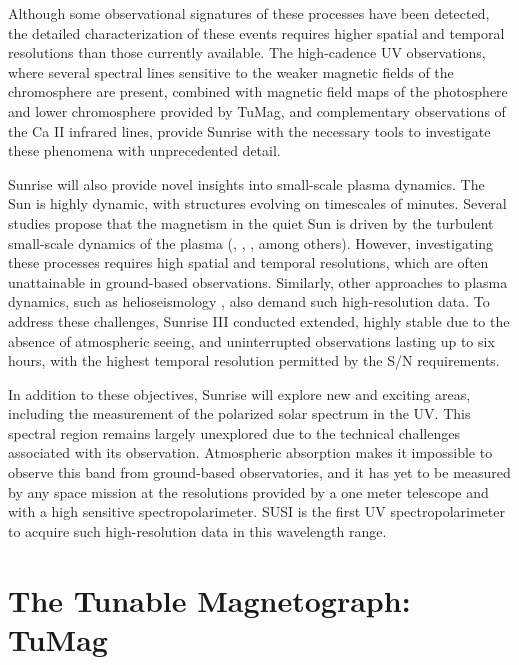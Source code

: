 Although some observational signatures of these processes have been detected, the detailed characterization of these events requires higher spatial and temporal resolutions than those currently available. The high-cadence UV observations, where several spectral lines sensitive to the weaker magnetic fields of the chromosphere are present, combined with magnetic field maps of the photosphere and lower chromosphere provided by TuMag, and complementary observations of the Ca II infrared lines, provide Sunrise with the necessary tools to investigate these phenomena with unprecedented detail.

Sunrise will also provide novel insights into small-scale plasma dynamics. The Sun is highly dynamic, with structures evolving on timescales of minutes. Several studies propose that the magnetism in the quiet Sun is driven by the turbulent small-scale dynamics of the plasma (\cite{small_scale_dynamo}, \cite{small_scale_dynamo_2}, \cite{small_scale_dynamo_3}, among others). However, investigating these processes requires high spatial and temporal resolutions, which are often unattainable in ground-based observations. Similarly, other approaches to plasma dynamics, such as helioseismology \citep{helioseismology}, also demand such high-resolution data. To address these challenges, Sunrise III conducted extended, highly stable due to the absence of atmospheric seeing, and uninterrupted observations lasting up to six hours, with the highest temporal resolution permitted by the S/N requirements.

In addition to these objectives, Sunrise will explore new and exciting areas, including the measurement of the polarized solar spectrum in the UV. This spectral region remains largely unexplored due to the technical challenges associated with its observation. Atmospheric absorption makes it impossible to observe this band from ground-based observatories, and it has yet to be measured by any space mission at the resolutions provided by a one meter telescope and with a high sensitive spectropolarimeter. SUSI is the first UV spectropolarimeter to acquire such high-resolution data in this wavelength range.

\section{The Tunable Magnetograph: TuMag}

